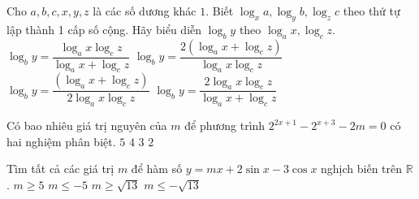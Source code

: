 \begin{ex}%
Cho $a,b,c,x,y,z$ là các số dương khác $1$. Biết $\log_x a, \log_y b, \log_z c$ theo thứ tự lập thành 1 cấp số cộng. Hãy biểu diễn $\log_b y $ theo $\log_a x, \log_c z$.
\choice
{$\log_by = \dfrac{\log_ax  \log_c z}{\log_ax + \log_c z}$}
{$\log_by = \dfrac{ 2 \left( \log_ax + \log_c z \right)}{  \log_ax  \log_c z}$}
{$\log_by = \dfrac{\left( \log_ax + \log_c z \right)}{2  \log_ax  \log_c z}$}
{\True $\log_by = \dfrac{2 \log_ax  \log_c z}{\log_ax + \log_c z} $}
\end{ex}

\begin{ex}%
 Có bao nhiêu giá trị nguyên của $m$ để phương trình $2^{2x+1}-2^{x+3}-2m=0$ có hai nghiệm phân biệt.
\choice
{$5$}
{$4$}
{\True $3$}
{$2$}
\end{ex}

\begin{ex}%
 Tìm tất cả các giá trị $m$ để hàm số $y=mx +2 \sin x -3 \cos x $ nghịch biến trên $\mathbb{R}$.
\choice
{$m\ge 5$}
{$m\le -5$}
{$m \ge \sqrt{13}$}
{\True $m\le - \sqrt{13} $}
\end{ex}

